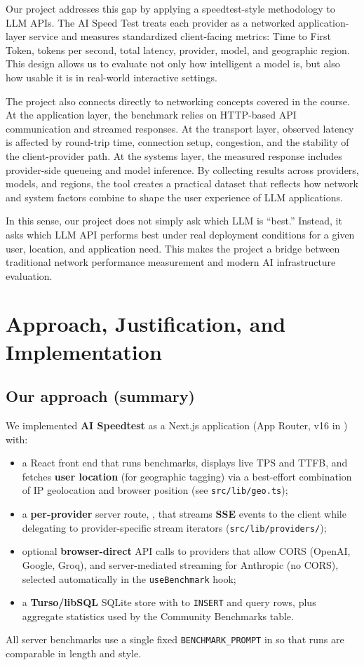 \documentclass[11pt, a4paper]{article}
\begin{document}
Our project addresses this gap by applying a speedtest-style methodology to LLM APIs. The AI Speed Test treats each provider as a networked application-layer service and measures standardized client-facing metrics: Time to First Token, tokens per second, total latency, provider, model, and geographic region. This design allows us to evaluate not only how intelligent a model is, but also how usable it is in real-world interactive settings.

The project also connects directly to networking concepts covered in the course. At the application layer, the benchmark relies on HTTP-based API communication and streamed responses. At the transport layer, observed latency is affected by round-trip time, connection setup, congestion, and the stability of the client-provider path. At the systems layer, the measured response includes provider-side queueing and model inference. By collecting results across providers, models, and regions, the tool creates a practical dataset that reflects how network and system factors combine to shape the user experience of LLM applications.

In this sense, our project does not simply ask which LLM is ``best.'' Instead, it asks which LLM API performs best under real deployment conditions for a given user, location, and application need. This makes the project a bridge between traditional network performance measurement and modern AI infrastructure evaluation.

\section{Approach, Justification, and Implementation}

\subsection{Our approach (summary)}
We implemented \textbf{AI Speedtest} as a Next.js application (App Router, v16 in ) with:
\begin{itemize}
  \item a React front end that runs benchmarks, displays live TPS and TTFB, and fetches \textbf{user location} (for geographic tagging) via a best-effort combination of IP geolocation and browser position (see \texttt{src/lib/geo.ts});
  \item a \textbf{per-provider} server route, , that streams \textbf{SSE} events to the client while delegating to provider-specific stream iterators (\texttt{src/lib/providers/});
  \item optional \textbf{browser-direct} API calls to providers that allow CORS (OpenAI, Google, Groq), and server-mediated streaming for Anthropic (no CORS), selected automatically in the \texttt{useBenchmark} hook;
  \item a \textbf{Turso/libSQL} SQLite store with  to \texttt{INSERT} and query rows, plus aggregate statistics used by the Community Benchmarks table.
\end{itemize}
All server benchmarks use a single fixed \texttt{BENCHMARK\_PROMPT} in  so that runs are comparable in length and style.
\end{document}
